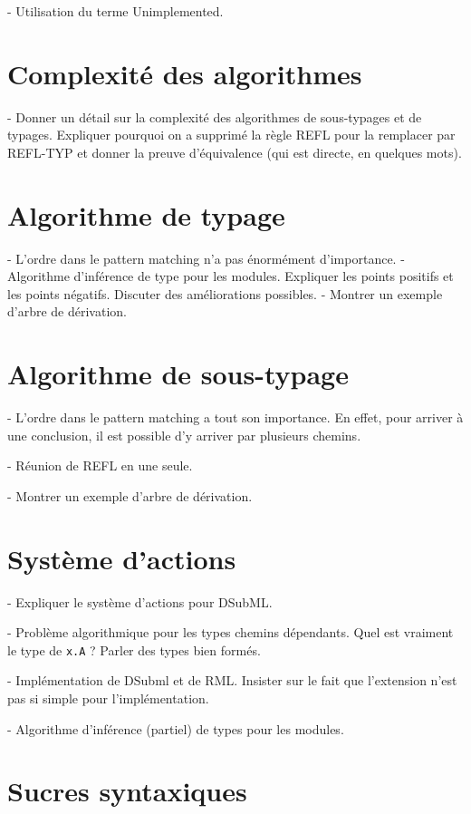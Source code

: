 - Utilisation du terme Unimplemented.

\section{Complexité des algorithmes}

- Donner un détail sur la complexité des algorithmes de sous-typages et de
typages. Expliquer pourquoi on a supprimé la règle REFL pour la remplacer par
REFL-TYP et donner la preuve d'équivalence (qui est directe, en quelques mots).

\section{Algorithme de typage}
- L'ordre dans le pattern matching n'a pas énormément d'importance.
- Algorithme d'inférence de type pour les modules. Expliquer les points positifs
et les points négatifs. Discuter des améliorations possibles.
- Montrer un exemple d'arbre de dérivation.

\section{Algorithme de sous-typage}

- L'ordre dans le pattern matching a tout son importance. En effet, pour arriver
à une conclusion, il est possible d'y arriver par plusieurs chemins.

- Réunion de REFL en une seule.

- Montrer un exemple d'arbre de dérivation.

\section{Système d'\og actions \fg}

- Expliquer le système d'actions pour DSubML.

- Problème algorithmique pour les types chemins dépendants. Quel est vraiment le
type de \verb|x.A| ? Parler des types bien formés.

- Implémentation de DSubml et de RML. Insister sur le fait que l'extension n'est
pas si simple pour l'implémentation.

- Algorithme d'inférence (partiel) de types pour les modules.

\section{Sucres syntaxiques}

